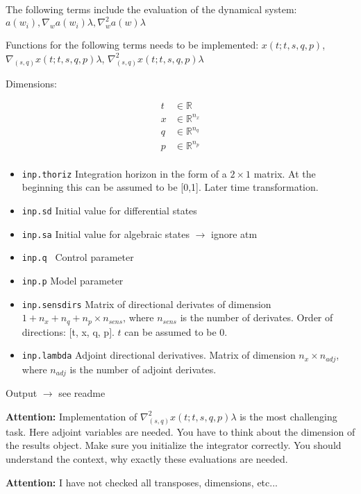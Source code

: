 \documentclass[12pt]{article}
\begin{document}
The following terms include the evaluation of the dynamical system: $a(w_i), \nabla_w a(w_i)\lambda, \nabla_w^2 a(w)\lambda $

Functions for the following terms needs to be implemented:
$x(t;t,s,q,p)$, $\nabla_{(s,q)} x(t;t,s,q,p)\lambda$, $\nabla^2_{(s,q)} x(t;t,s,q,p) \lambda$


%  

Dimensions:

\begin{align}
  t &\in \mathbb{R}                \\
  x &\in \mathbb{R}^{n_x}         \\
  q &\in \mathbb{R}^{n_q}         \\
  p &\in \mathbb{R}^{n_p}         \\
\end{align}

\begin{itemize}
    \item \texttt{inp.thoriz} Integration horizon in the form of a $2 \times 1$ matrix. At the beginning  this can be assumed to be [0,1]. Later time transformation.
    \item \texttt{inp.sd} Initial value for differential states 
    \item \texttt{inp.sa} Initial value for algebraic states $\rightarrow$ ignore atm
    \item \texttt{inp.q } Control parameter
    \item \texttt{inp.p} Model parameter
    \item \texttt{inp.sensdirs} Matrix of directional derivates of dimension $1+n_x+n_q+n_p \times n_{sens}$, where $n_{sens}$ is the number of derivates.
         Order of directions: [t, x, q, p]. $t$ can be assumed to be 0.
    \item \texttt{inp.lambda} Adjoint directional derivatives. 
           Matrix of dimension $n_x \times n_{adj}$, where $n_{adj}$ is the number of adjoint derivates.
\end{itemize}


Output $\rightarrow$ see readme


\textbf{Attention:} Implementation of $\nabla^2_{(s,q)} x(t;t,s,q,p) \lambda$ is the most challenging task. 
Here adjoint variables are needed. 
You have to think about the dimension of the results object. Make sure you initialize the integrator correctly. 
You should understand the context, why exactly these evaluations are needed.


\textbf{Attention:} I have not checked all transposes, dimensions, etc...
\end{document}
